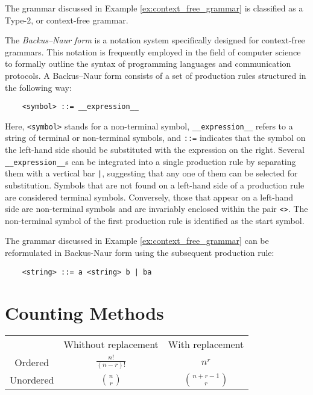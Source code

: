 \begin{example}
The grammar discussed in Example \ref{ex:context_free_grammar} is classified as a Type-2, or context-free grammar.
\end{example}

The \emph{Backus–Naur form} is a notation system specifically designed for context-free grammars. This notation is frequently employed in the field of computer science to formally outline the syntax of programming languages and communication protocols. A Backus–Naur form consists of a set of production rules structured in the following way:

\begin{verbatim}
    <symbol> ::= __expression__
\end{verbatim}

Here, \texttt{<symbol>} stands for a non-terminal symbol, \texttt{\_\_expression\_\_} refers to a string of terminal or non-terminal symbols, and \texttt{::=} indicates that the symbol on the left-hand side should be substituted with the expression on the right. Several \texttt{\_\_expression\_\_}s can be integrated into a single production rule by separating them with a vertical bar \texttt{|}, suggesting that any one of them can be selected for substitution. Symbols that are not found on a left-hand side of a production rule are considered terminal symbols. Conversely, those that appear on a left-hand side are non-terminal symbols and are invariably enclosed within the pair \texttt{<>}. The non-terminal symbol of the first production rule is identified as the start symbol.

\begin{example}
The grammar discussed in Example \ref{ex:context_free_grammar} can be reformulated in Backus-Naur form using the subsequent production rule:
\begin{verbatim}
    <string> ::= a <string> b | ba
\end{verbatim}
\end{example}

%
%

\section{Counting Methods}
\label{sec:counting}

{\color{red}
\begin{center}
\begin{tabular}{ c c c }
  & Whithout replacement & With replacement \\ 
 Ordered    & $\frac{n!}{(n-r)!}$ & $n^r$ \\  
 Unordered & $\binom{n}{r}$ & $\binom{n+r-1}{r}$    
\end{tabular}
\end{center}
}

